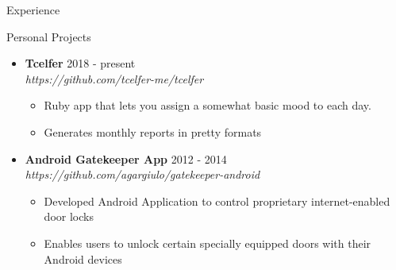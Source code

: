 \documentclass[10pt,oneside]{article}
\newenvironment{ressection}[1]{
	\vspace{3pt}
	{\fontfamily{bch}\selectfont\Large#1}
	\begin{itemize}
	\vspace{2pt}
}{
	\end{itemize}
}
\newcommand{\ressubitem}[1]{
	\vspace{-1pt}
	\item \begin{flushleft} #1 \end{flushleft}
}
\newcommand{\resbigitem}[3]{
	\vspace{-3pt}
	\item
	\textbf{#1} --- #2 \\
	\textit{#3}
}
\newcommand{\resaltitem}[3]{
	\vspace{-3pt}
	\item
	\textbf{#1} \hfill #2 \\
	\textit{#3}
}
\newenvironment{ressubsec}[3]{
	\resbigitem{#1}{#2}{#3}
	\vspace{-1pt}
	\begin{itemize}
}{
	\end{itemize}
}
\newenvironment{resaltsec}[3]{
	\resaltitem{#1}{#2}{#3}
	\vspace{-1pt}
	\begin{itemize}
}{
	\end{itemize}
}
\begin{document}
\begin{ressection}{Experience}

\end{ressection}


\begin{ressection}{Personal Projects}


	\begin{resaltsec}{Tcelfer}{2018 - present}{https://github.com/tcelfer-me/tcelfer}
		\ressubitem{Ruby app that lets you assign a somewhat basic mood to each day.}
		\ressubitem{Generates monthly reports in pretty formats}
	\end{resaltsec}

	\begin{resaltsec}{Android Gatekeeper App}{2012 - 2014}{https://github.com/agargiulo/gatekeeper-android}
		\ressubitem{Developed Android Application to control proprietary internet-enabled door locks}
		\ressubitem{Enables users to unlock certain specially equipped doors with their Android devices}
	\end{resaltsec}


\end{ressection}
\end{document}
